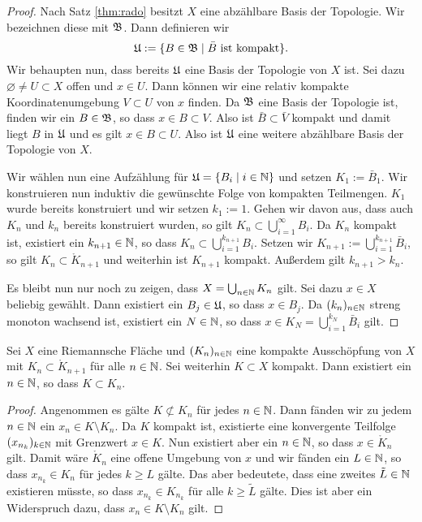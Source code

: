 \begin{proof}
  Nach Satz \ref{thm:rado} besitzt $X$ eine abzählbare Basis der
  Topologie. Wir bezeichnen diese mit $\mathfrak{B}$. Dann definieren wir
  \[
  \mathfrak{U} := \{ B \in \mathfrak{B} \mid \bar B \text{ ist kompakt}\}.
  \]
  Wir behaupten nun, dass bereits $\mathfrak{U}$ eine Basis der Topologie von
  $X$ ist. Sei dazu $\varnothing \neq U \subset X$ offen und $x \in U$. Dann
  können wir eine relativ kompakte Koordinatenumgebung $V \subset U$
  von $x$ finden. Da $\mathfrak{B}$ eine Basis der Topologie ist, finden wir
  ein $B \in \mathfrak{B}$, so dass $x \in B \subset V$. Also ist $\bar B
  \subset \bar V$ kompakt und damit liegt $B$ in $\mathfrak{U}$ und es gilt $x
  \in B \subset U$. Also ist $\mathfrak{U}$ eine weitere abzählbare Basis der
  Topologie von $X$.

  Wir wählen nun eine Aufzählung für $\mathfrak{U} = \{B_i \mid i \in \mathbb{N}\}$ und
  setzen $K_1 := \bar B_1$. Wir konstruieren nun induktiv die
  gewünschte Folge von kompakten Teilmengen. $K_1$ wurde bereits
  konstruiert und wir setzen $k_1 := 1$. Gehen wir davon aus, dass auch
  $K_n$ und $k_n$ bereits
  konstruiert wurden, so gilt $K_n \subset \bigcup_{i=1}^\infty
  B_i$. Da $K_n$ kompakt ist, existiert ein $k_{n+1} \in \mathbb{N}$, so dass $K_n
  \subset \bigcup_{i=1}^{k_{n+1}} B_i$. Setzen wir $K_{n+1} :=
  \bigcup_{i=1}^{k_{n+1}}\bar B_i$, so gilt $K_n \subset \mathring
  K_{n+1}$ und weiterhin ist $K_{n+1}$ kompakt. Außerdem gilt
  $k_{n+1} > k_n$.

  Es bleibt nun nur noch zu zeigen, dass $X = \bigcup_{n \in \mathbb{N}} K_n$
  gilt. Sei dazu $x \in X$ beliebig gewählt. Dann existiert ein $B_j \in
  \mathfrak{U}$, so dass $x \in B_j$. Da $(k_n)_{n \in\mathbb{N}}$ streng monoton
  wachsend ist, existiert ein $N \in \mathbb{N}$, so dass $x \in K_N =
  \bigcup_{i=1}^{k_N} \bar B_i$ gilt.
\end{proof}

\begin{lemma}
  \label{lemma:kompakt-in-ausschöpfung}
  Sei $X$ eine Riemannsche Fläche und $(K_n)_{n \in \mathbb{N}}$ eine kompakte
  Ausschöpfung von $X$ mit $K_n \subset \mathring K_{n+1}$ für alle $n
  \in \mathbb{N}$. Sei weiterhin $K \subset X$ kompakt. Dann existiert ein $n
  \in \mathbb{N}$, so dass $K \subset K_n$.
\end{lemma}

\begin{proof}
  Angenommen es gälte $K \not \subset K_n$ für jedes $n \in \mathbb{N}$. Dann
  fänden wir zu jedem $n \in \mathbb{N}$ ein $x_n \in K\setminus K_n$. Da $K$
  kompakt ist, existierte eine konvergente Teilfolge $(x_{n_k})_{k\in
    \mathbb{N}}$ mit Grenzwert $x \in K$. Nun existiert aber ein $n \in \mathbb{N}$,
  so dass $x \in \mathring K_n$ gilt. Damit wäre $\mathring K_n$ eine offene
  Umgebung von $x$ und wir fänden ein $L \in \mathbb{N}$, so dass $x_{n_k} \in
  K_n$ für jedes $k\geq L$ gälte. Das aber bedeutete, dass eine
  zweites $\tilde L \in \mathbb{N}$ existieren müsste, so dass $x_{n_k} \in K_{n_k}$
  für alle $k \geq \tilde L$ gälte. Dies ist aber ein Widerspruch dazu,
  dass $x_n \in K \setminus K_n$ gilt.
\end{proof}


